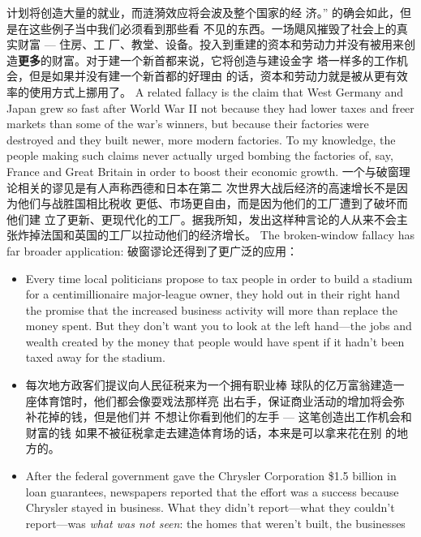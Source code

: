 \begin{paracol}{2}
计划将创造大量的就业，而涟漪效应将会波及整个国家的经
济。” 的确会如此，但是在这些例子当中我们必须看到那些看
不见的东西。一场飓风摧毁了社会上的真实财富 --- 住房、工
厂、教堂、设备。投入到重建的资本和劳动力并没有被用来创
造\textbf{更多}的财富。对于建一个新首都来说，它将创造与建设金字
塔一样多的工作机会，但是如果并没有建一个新首都的好理由
的话，资本和劳动力就是被从更有效率的使用方式上挪用了。
\switchcolumn*
A related fallacy is the claim that West Germany and Japan
grew so fast after World War II not because they had lower
taxes and freer markets than some of the war's winners, but because their factories were destroyed and they built newer, more
modern factories. To my knowledge, the people making such
claims never actually urged bombing the factories of, say,
France and Great Britain in order to boost their economic
growth.
\switchcolumn
一个与破窗理论相关的谬见是有人声称西德和日本在第二
次世界大战后经济的高速增长不是因为他们与战胜国相比税收
更低、市场更自由，而是因为他们的工厂遭到了破坏而他们建
立了更新、更现代化的工厂。据我所知，发出这样种言论的人从来不会主张炸掉法国和英国的工厂以拉动他们的经济增长。
\switchcolumn*
The broken-window fallacy has far broader application:
\switchcolumn
破窗谬论还得到了更广泛的应用：
\switchcolumn*
\begin{itemize}
	\item Every time local politicians propose to tax people in order
	to build a stadium for a centimillionaire major-league owner, they hold out in their right hand the promise that the increased
	business activity will more than replace the money spent. But
	they don't want you to look at the left hand---the jobs and
	wealth created by the money that people would have spent if it
	hadn't been taxed away for the stadium.
\end{itemize}
\switchcolumn
\begin{itemize}
	\item 每次地方政客们提议向人民征税来为一个拥有职业棒
	球队的亿万富翁建造一座体育馆时，他们都会像耍戏法那样亮
	出右手，保证商业活动的增加将会弥补花掉的钱，但是他们并
	不想让你看到他们的左手 --- 这笔创造出工作机会和财富的钱
	如果不被征税拿走去建造体育场的话，本来是可以拿来花在别
	的地方的。
\end{itemize}
\switchcolumn*
\begin{itemize}
	\item After the federal government gave the Chrysler Corporation \$1.5 billion in loan guarantees, newspapers reported that
	the effort was a success because Chrysler stayed in business.
	What they didn't report---what they couldn't report---was \textit{what was not seen}: the homes that weren't built, the businesses

\end{itemize}
\end{paracol}
